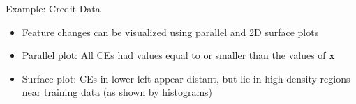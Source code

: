 \documentclass[10pt,compress,t,notes=noshow, xcolor=table]{beamer}
\begin{document}
\begin{frame}{Example: Credit Data }
\begin{itemize}
	\item<1-> Feature changes can be visualized using parallel and 2D surface plots
		\item<1-> Parallel plot: All CEs had values equal to or smaller than the values of $\mathbf{x}$
		\item<2-> Surface plot: CEs in lower-left appear distant, but lie in high-density regions near training data (as shown by histograms)
	\end{itemize}
	\begin{columns}[totalwidth=\textwidth]
\end{columns}
\end{frame}
\end{document}
